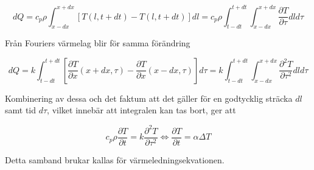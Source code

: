 \begin{equation}
dQ = c_p \rho \int_{x-dx}^{x+dx} \left[ T\left( l, t+dt\right) - T\left( l, t+dt\right)\right]dl = c_p \rho \int_{t-dt}^{t+dt} \int_{x-dx}^{x+dx} \frac{\partial T}{\partial \tau} dld\tau
\end{equation}

Från Fouriers värmelag blir för samma förändring

\begin{equation}
dQ = k\int_{t-dt}^{t+dt} \left[ \frac{\partial T}{\partial x}\left( x + dx, \tau \right) - \frac{\partial T}{\partial x}\left( x-dx, \tau \right)\right]d\tau = k\int_{t-dt}^{t+dt} \int_{x-dx}^{x+dx} \frac{\partial^2 T}{\partial \tau^2} dld\tau
\end{equation}

Kombinering av dessa och det faktum att det gäller för en godtycklig sträcka $dl$ samt tid $d\tau$, vilket innebär att integralen kan tas bort, ger att

\begin{equation}\boxed{ \; \; \;
c_p \rho \frac{\partial T}{\partial t} = k \frac{\partial^2 T}{\partial \tau^2} \Leftrightarrow \frac{\partial T}{\partial t} = \alpha \Delta T
\; \; \; }
\end{equation}

Detta samband brukar kallas för värmeledningsekvationen.
